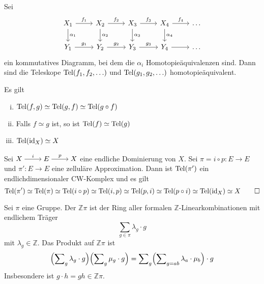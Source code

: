 \begin{bemerkung}
	Sei
	\[
		\begin{tikzcd}
			X_1 \dar["\alpha_1"] \rar["f_1"] & X_2 \rar["f_2"] \dar["\alpha_2"] & X_3 \dar["\alpha_3"] \rar["f_3"] & X_4 \dar["\alpha_4"] \rar["f_4"] & \ldots  \\
			Y_1 \rar["g_1"] & Y_2 \rar["g_2"] & Y_3 \rar["g_3"] & Y_4 \rar & \ldots 
		\end{tikzcd}
	\]
	ein kommutatives Diagramm, bei dem die $\alpha_i$ Homotopieäquivalenzen sind.
	Dann sind die Teleskope $\operatorname{Tel}(f_1, f_2, \ldots )$ und $\operatorname{Tel}(g_1, g_2, \ldots )$ homotopieäquivalent.
\end{bemerkung}

\begin{bemerkung}
	Es gilt 
	\begin{enumerate}[(i)]
		\item $\operatorname{Tel}(f,g) \simeq \operatorname{Tel}(g,f) \simeq \operatorname{Tel}(g \circ f)$
		\item Falls $f \simeq g$ ist, so ist $\operatorname{Tel}(f) \simeq \operatorname{Tel}(g)$
		\item $\operatorname{Tel}(\operatorname{id}_X) \simeq X$
	\end{enumerate}
\end{bemerkung}

\begin{beweis}[{name={von \autoref{satz:endl_dom_endl_cw}}}]
	Sei $\begin{tikzcd}[cramped]
		X \rar["i"] & E \rar["p"] & X
	\end{tikzcd}$
	eine endliche Dominierung von $X$.
	Sei $\pi = i \circ p \colon E \to E$ und $\pi' \colon E \to E$ eine zelluläre Approximation.
	Dann ist $\operatorname{Tel}(\pi')$ ein endlichdimensionaler CW-Komplex und es gilt 
	\[
		\operatorname{Tel}(\pi') \simeq \operatorname{Tel}(\pi) \simeq \operatorname{Tel}(i \circ p) \simeq \operatorname{Tel}(i,p) \simeq \operatorname{Tel}(p,i) \simeq \operatorname{Tel}(p \circ i) \simeq \operatorname{Tel}(\operatorname{id}_X) \simeq X \qedhere
	\]
\end{beweis}

\begin{definition}[{name=[Gruppenring]}]
	Sei $\pi$ eine Gruppe.
	Der  $\mathbb{Z}\pi$  ist der Ring aller formalen $\mathbb{Z}$-Linearkombinationen mit endlichem Träger
	\[
		\sum_{g \in \pi} \lambda_g \cdot g
	\]
	mit $\lambda_g \in \mathbb{Z}$.
	Das Produkt auf $\mathbb{Z}\pi$ ist 
	\[
		\enbrace*{\sum\nolimits_g \lambda_g \cdot g} \enbrace*{\sum\nolimits_g \mu_g \cdot g} = \sum\nolimits_g \enbrace*{\sum\nolimits_{g= a b} \lambda_a \cdot \mu_b} \cdot g
	\]
	Insbesondere ist $g \cdot h = gh \in \mathbb{Z}\pi$.
\end{definition}

